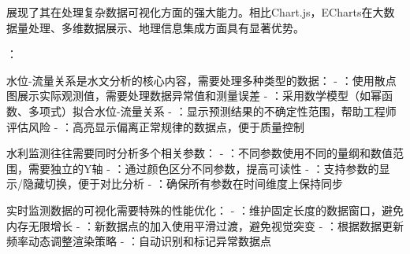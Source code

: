 展现了其在处理复杂数据可视化方面的强大能力。相比Chart.js，ECharts在大数据量处理、多维数据展示、地理信息集成方面具有显著优势。

：


水位-流量关系是水文分析的核心内容，需要处理多种类型的数据： - ：使用散点图展示实际观测值，需要处理数据异常值和测量误差 - ：采用数学模型（如幂函数、多项式）拟合水位-流量关系 - ：显示预测结果的不确定性范围，帮助工程师评估风险 - ：高亮显示偏离正常规律的数据点，便于质量控制


水利监测往往需要同时分析多个相关参数： - ：不同参数使用不同的量纲和数值范围，需要独立的Y轴 - ：通过颜色区分不同参数，提高可读性 - ：支持参数的显示/隐藏切换，便于对比分析 - ：确保所有参数在时间维度上保持同步


实时监测数据的可视化需要特殊的性能优化： - ：维护固定长度的数据窗口，避免内存无限增长 - ：新数据点的加入使用平滑过渡，避免视觉突变 - ：根据数据更新频率动态调整渲染策略 - ：自动识别和标记异常数据点

